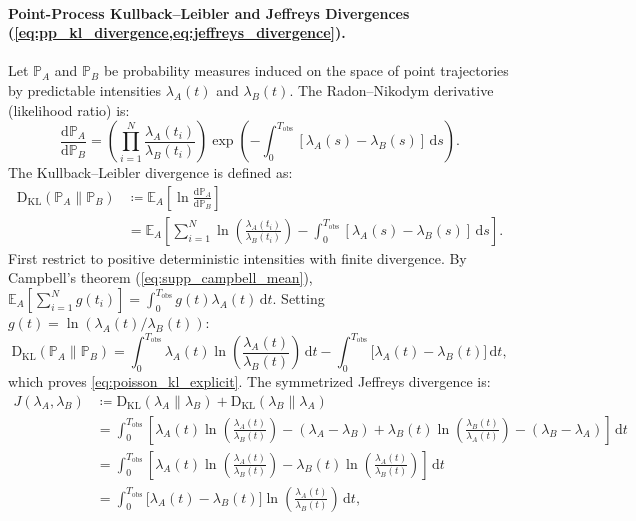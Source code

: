 \paragraph{Point-Process Kullback--Leibler and Jeffreys Divergences
(\cref{eq:pp_kl_divergence,eq:jeffreys_divergence}).}
Let $\mathbb{P}_A$ and $\mathbb{P}_B$ be probability measures
induced on the space of point trajectories
by predictable intensities $\lambda_A(t)$ and $\lambda_B(t)$.
The Radon--Nikodym derivative (likelihood ratio) is:
\begin{equation}
  \frac{\mathrm{d}\mathbb{P}_A}{\mathrm{d}\mathbb{P}_B} = \left(
  \prod_{i=1}^N \frac{\lambda_A(t_i)}{\lambda_B(t_i)} \right)
  \exp\left( -\int_0^{T_{\mathrm{obs}}} [\lambda_A(s) -
  \lambda_B(s)]\,\mathrm{d}s \right).
\end{equation}
The Kullback--Leibler divergence is defined as:
\begin{equation}
  \begin{aligned}
    \mathrm{D}_{\mathrm{KL}}(\mathbb{P}_A \parallel \mathbb{P}_B)
    &\coloneqq \mathbb{E}_A\left[ \ln
    \frac{\mathrm{d}\mathbb{P}_A}{\mathrm{d}\mathbb{P}_B} \right] \\
    &= \mathbb{E}_A\left[ \sum_{i=1}^N
      \ln\left(\frac{\lambda_A(t_i)}{\lambda_B(t_i)}\right) -
      \int_0^{T_{\mathrm{obs}}} [\lambda_A(s) -
    \lambda_B(s)]\,\mathrm{d}s \right].
  \end{aligned}
\end{equation}
First restrict to positive deterministic intensities with finite
divergence. By Campbell's theorem (\cref{eq:supp_campbell_mean}),
$\mathbb{E}_A[\sum_{i=1}^N g(t_i)] = \int_0^{T_{\mathrm{obs}}}
g(t)\lambda_A(t)\,\mathrm{d}t$.
Setting $g(t) = \ln(\lambda_A(t)/\lambda_B(t))$:
\begin{equation}
  \mathrm{D}_{\mathrm{KL}}(\mathbb{P}_A \parallel \mathbb{P}_B) =
  \int_0^{T_{\mathrm{obs}}} \lambda_A(t)
  \ln\left(\frac{\lambda_A(t)}{\lambda_B(t)}\right)\,\mathrm{d}t -
  \int_0^{T_{\mathrm{obs}}} \bigl[\lambda_A(t) -
  \lambda_B(t)\bigr]\,\mathrm{d}t,
\end{equation}
which proves \cref{eq:poisson_kl_explicit}. The symmetrized
Jeffreys divergence is:
\begin{equation}
  \begin{aligned}
    J(\lambda_A, \lambda_B) &\coloneqq
    \mathrm{D}_{\mathrm{KL}}(\lambda_A \parallel \lambda_B) +
    \mathrm{D}_{\mathrm{KL}}(\lambda_B \parallel \lambda_A) \\
    &= \int_0^{T_{\mathrm{obs}}} \left[
      \lambda_A(t)\ln\left(\frac{\lambda_A(t)}{\lambda_B(t)}\right) -
      (\lambda_A - \lambda_B) +
      \lambda_B(t)\ln\left(\frac{\lambda_B(t)}{\lambda_A(t)}\right) -
    (\lambda_B - \lambda_A) \right] \,\mathrm{d}t \\
    &= \int_0^{T_{\mathrm{obs}}} \left[
      \lambda_A(t)\ln\left(\frac{\lambda_A(t)}{\lambda_B(t)}\right) -
      \lambda_B(t)\ln\left(\frac{\lambda_A(t)}{\lambda_B(t)}\right)
    \right] \,\mathrm{d}t \\
    &= \int_0^{T_{\mathrm{obs}}} \bigl[\lambda_A(t) -
    \lambda_B(t)\bigr]
    \ln\left(\frac{\lambda_A(t)}{\lambda_B(t)}\right)\,\mathrm{d}t,
  \end{aligned}
\end{equation}
